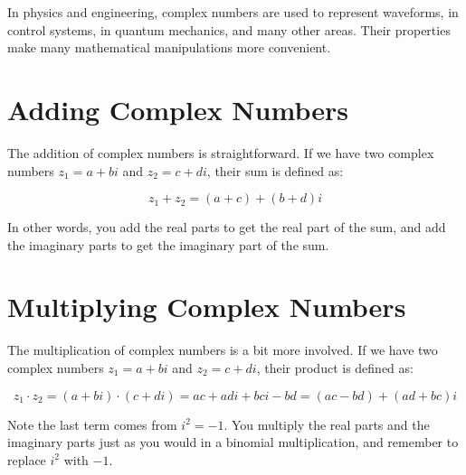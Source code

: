 In physics and engineering, complex numbers are used to represent waveforms, in control systems, in quantum mechanics, and many other areas. Their properties make many mathematical manipulations more convenient.

\section{Adding Complex Numbers}

The addition of complex numbers is straightforward. If we have two complex numbers $z_1 = a + bi$ and $z_2 = c + di$, their sum is defined as:

\begin{equation}
z_1 + z_2 = (a + c) + (b + d)i
\end{equation}

In other words, you add the real parts to get the real part of the sum, and add the imaginary parts to get the imaginary part of the sum.

\section{Multiplying Complex Numbers}

The multiplication of complex numbers is a bit more involved. If we have two complex numbers $z_1 = a + bi$ and $z_2 = c + di$, their product is defined as:

\begin{equation}
z_1 \cdot z_2 = (a + bi) \cdot (c + di) = ac + adi + bci - bd = (ac - bd) + (ad + bc)i
\end{equation}

Note the last term comes from $i^2 = -1$. You multiply the real parts and the imaginary parts just as you would in a binomial multiplication, and remember to replace $i^2$ with $-1$.

